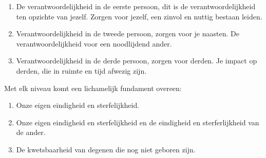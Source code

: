 \documentclass[11pt,a4paper,titlepage]{article}
\begin{document}
\begin{enumerate}
\item De verantwoordelijkheid in de eerste persoon, dit is de verantwoordelijkheid ten opzichte van jezelf. Zorgen voor jezelf, een zinvol en nuttig bestaan leiden.
\item Verantwoordelijkheid in de tweede persoon, zorgen voor je naasten. De verantwoordelijkheid voor een noodlijdend ander.
\item Verantwoordelijkheid in de derde persoon, zorgen voor derden. Je impact op derden, die in ruimte en tijd afwezig zijn.
\end{enumerate}
Met elk niveau komt een lichamelijk fundament overeen:
\begin{enumerate}
\item Onze eigen eindigheid en sterfelijkheid.
\item Onze eigen eindigheid en sterfelijkheid en de eindigheid en sterferlijkheid van de ander.
\item De kwetsbaarheid van degenen die nog niet geboren zijn.

\end{enumerate}
\end{document}
